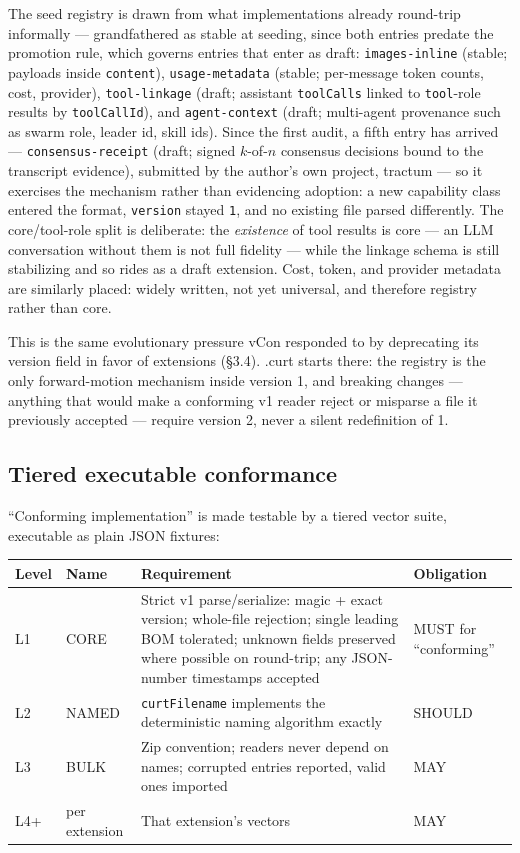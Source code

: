 \documentclass[11pt]{article}
\begin{document}
The seed registry is drawn from what implementations already round-trip informally --- grandfathered as stable at seeding, since both entries predate the promotion rule, which governs entries that enter as draft: \texttt{images-inline} (stable; payloads inside \texttt{content}), \texttt{usage-metadata} (stable; per-message token counts, cost, provider), \texttt{tool-linkage} (draft; assistant \texttt{toolCalls} linked to \texttt{tool}-role results by \texttt{toolCallId}), and \texttt{agent-context} (draft; multi-agent provenance such as swarm role, leader id, skill ids). Since the first audit, a fifth entry has arrived --- \texttt{consensus-receipt} (draft; signed $k$-of-$n$ consensus decisions bound to the transcript evidence), submitted by the author's own project, tractum --- so it exercises the mechanism rather than evidencing adoption: a new capability class entered the format, \texttt{version} stayed \texttt{1}, and no existing file parsed differently. The core/tool-role split is deliberate: the \emph{existence} of tool results is core --- an LLM conversation without them is not full fidelity --- while the linkage schema is still stabilizing and so rides as a draft extension. Cost, token, and provider metadata are similarly placed: widely written, not yet universal, and therefore registry rather than core.

This is the same evolutionary pressure vCon responded to by deprecating its version field in favor of extensions (\S3.4). .curt starts there: the registry is the only forward-motion mechanism inside version 1, and breaking changes --- anything that would make a conforming v1 reader reject or misparse a file it previously accepted --- require version 2, never a silent redefinition of 1.

\subsection{Tiered executable conformance}

``Conforming implementation'' is made testable by a tiered vector suite, executable as plain JSON fixtures:

\begin{table}[h]
\centering
\small
\begin{tabular}{@{}l l p{6.4cm} l@{}}
\hline
Level & Name & Requirement & Obligation \\
\hline
L1 & CORE & Strict v1 parse/serialize: magic + exact version; whole-file rejection; single leading BOM tolerated; unknown fields preserved where possible on round-trip; any JSON-number timestamps accepted & MUST for ``conforming'' \\
L2 & NAMED & \texttt{curtFilename} implements the deterministic naming algorithm exactly & SHOULD \\
L3 & BULK & Zip convention; readers never depend on names; corrupted entries reported, valid ones imported & MAY \\
L4+ & per extension & That extension's vectors & MAY \\
\hline
\end{tabular}
\end{table}
\end{document}
